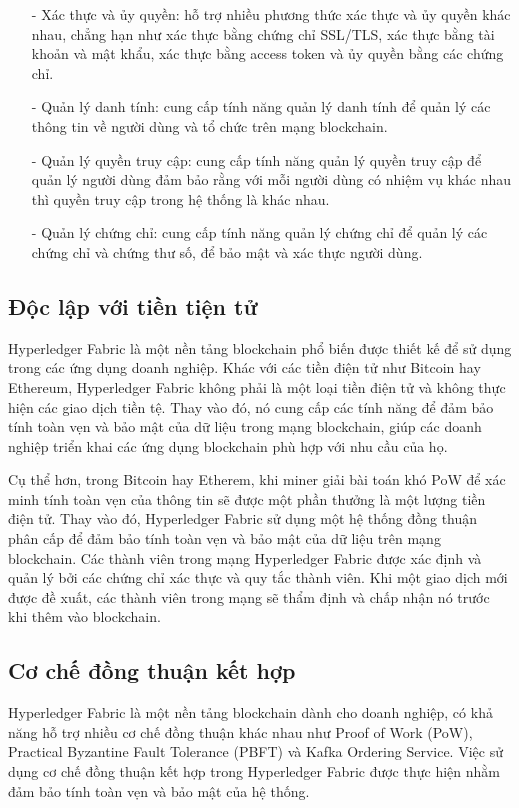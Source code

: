 \begin{itemize}
    \item[-] Xác thực và ủy quyền: hỗ trợ nhiều phương thức xác thực và ủy quyền khác nhau, 
    chẳng hạn như xác thực bằng chứng chỉ SSL/TLS, xác thực bằng tài khoản và mật khẩu, 
    xác thực bằng access token và ủy quyền bằng các chứng chỉ.
    \item[-] Quản lý danh tính: cung cấp tính năng quản lý danh tính để quản lý các thông tin
    về người dùng và tổ chức trên mạng blockchain.
    \item[-] Quản lý quyền truy cập: cung cấp tính năng quản lý quyền truy cập để quản lý 
    người dùng đảm bảo rằng với mỗi người dùng có nhiệm vụ khác nhau thì quyền truy cập trong
    hệ thống là khác nhau.
    \item[-] Quản lý chứng chỉ: cung cấp tính năng quản lý chứng chỉ để quản lý các chứng chỉ
    và chứng thư số, để bảo mật và xác thực người dùng. 

\end{itemize}
\subsection{Độc lập với tiền tiện tử}

Hyperledger Fabric là một nền tảng blockchain phổ biến được thiết kế để sử dụng trong các 
ứng dụng doanh nghiệp. Khác với các tiền điện tử như Bitcoin hay Ethereum, Hyperledger 
Fabric không phải là một loại tiền điện tử và không thực hiện các giao dịch tiền tệ. Thay 
vào đó, nó cung cấp các tính năng để đảm bảo tính toàn vẹn và bảo mật của dữ liệu trong 
mạng blockchain, giúp các doanh nghiệp triển khai các ứng dụng blockchain phù hợp với nhu 
cầu của họ.

Cụ thể hơn, trong Bitcoin hay Etherem, khi miner giải bài toán khó PoW để xác minh tính
toàn vẹn của thông tin sẽ được một phần thưởng là một lượng tiền điện tử. Thay vào đó, Hyperledger Fabric
sử dụng một hệ thống đồng thuận phân cấp để đảm bảo tính toàn vẹn và bảo mật của dữ liệu 
trên mạng blockchain. Các thành viên trong mạng Hyperledger Fabric được xác định và quản 
lý bởi các chứng chỉ xác thực và quy tắc thành viên. Khi một giao dịch mới được đề xuất, 
các thành viên trong mạng sẽ thẩm định và chấp nhận nó trước khi thêm vào blockchain.

\subsection{Cơ chế đồng thuận kết hợp}
Hyperledger Fabric là một nền tảng blockchain dành cho doanh nghiệp, có khả năng hỗ trợ 
nhiều cơ chế đồng thuận khác nhau như Proof of Work (PoW), Practical Byzantine Fault 
Tolerance (PBFT) và Kafka Ordering Service. Việc sử dụng cơ chế đồng thuận kết hợp trong 
Hyperledger Fabric được thực hiện nhằm đảm bảo tính toàn vẹn và bảo mật của hệ thống. 


